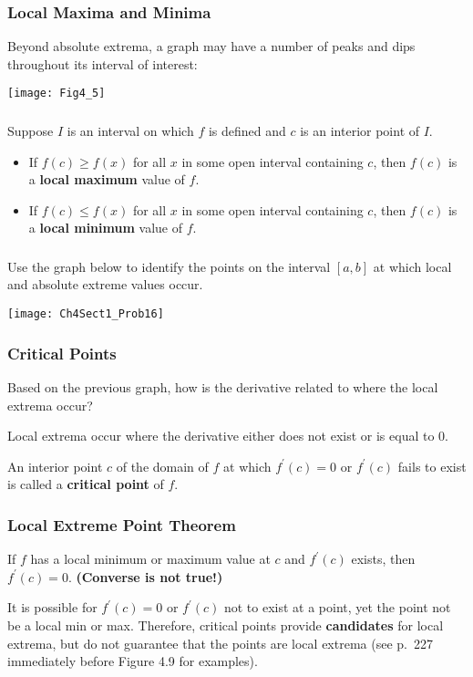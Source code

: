\documentclass[14pt]{beamer}
\begin{document}
\begin{frame}
\frametitle{Local Maxima and Minima}
\small
Beyond absolute extrema, a graph may have a number of peaks and dips throughout its interval of interest:
\begin{center}
\texttt{[image: Fig4\_5]}
\end{center}
\end{frame}

\begin{frame}
\frametitle{}
\small
\begin{dfn} Suppose $I$ is an interval on which $f$ is defined and $c$ is an interior point of $I$.
\begin{itemize}
\item If $f(c)\ge f(x)$ for all $x$ in some open interval containing $c$, then $f(c)$ is a {\bf local maximum} value of $f$.
\item If $f(c)\le f(x)$ for all $x$ in some open interval containing $c$, then $f(c)$ is a {\bf local minimum} value of $f$.
\end{itemize}
\end{dfn}
\end{frame}

\begin{frame}
\frametitle{}
\small
\begin{exe} Use the graph below to identify the points on the interval $[a,b]$ at which local and absolute extreme values occur.
\begin{center}
\texttt{[image: Ch4Sect1\_Prob16]}
\end{center}
\end{exe}
\end{frame}

\begin{frame}
\frametitle{Critical Points}
Based on the previous graph, how is the derivative related to where the local extrema occur?

\vspace{1pc}
Local extrema occur where the derivative either does not exist or is equal to 0.

\begin{dfn} An interior point $c$ of the domain of $f$ at which $f^{\prime}(c)=0$ or $f^{\prime}(c)$ fails to exist is called a {\bf critical point} of $f$. \end{dfn}
\end{frame}

\begin{frame}
\frametitle{Local Extreme Point Theorem}
\small
\begin{thm} If $f$ has a local minimum or maximum value at $c$ and $f^{\prime}(c)$ exists, then $f^{\prime}(c)=0$.  \alert{\bf (Converse is not true!)} \end{thm}

It is possible for $f^{\prime}(c)=0$ or $f^{\prime}(c)$ not to exist at a point, yet the point not be a local min or max.  Therefore, critical points provide {\bf candidates} for local extrema, but do not guarantee that the points are local extrema (see p.\ 227 immediately before Figure 4.9 for examples).
\end{frame}
\end{document}
